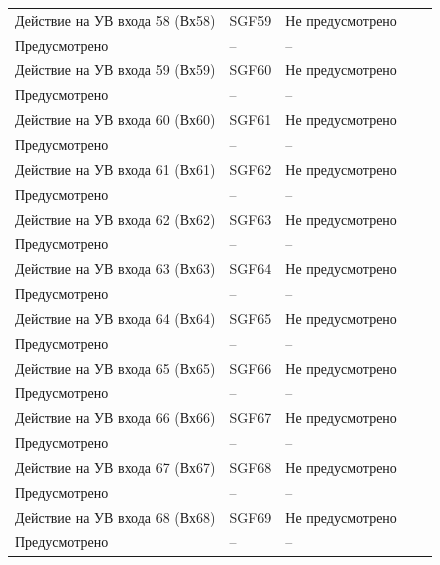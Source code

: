 \begin{longtable}{|>{\centering\arraybackslash}m{5.3cm}|>{\centering\arraybackslash}m{3.3cm}|>{\centering\arraybackslash}m{4.2cm}|>{\centering\arraybackslash}m{1.8cm}|>{\centering\arraybackslash}m{1cm}|}
\hline
\centering Действие на УВ входа 58 (Вх58)  & \centering SGF59 & \centering Не предусмотрено \\ Предусмотрено & \centering -- & \centering \arraybackslash -- \\
\hline
\centering Действие на УВ входа 59 (Вх59)  & \centering SGF60 & \centering Не предусмотрено \\ Предусмотрено & \centering -- & \centering \arraybackslash -- \\
\hline
\centering Действие на УВ входа 60 (Вх60)  & \centering SGF61 & \centering Не предусмотрено \\ Предусмотрено & \centering -- & \centering \arraybackslash -- \\
\hline
\centering Действие на УВ входа 61 (Вх61)  & \centering SGF62 & \centering Не предусмотрено \\ Предусмотрено & \centering -- & \centering \arraybackslash -- \\
\hline
\centering Действие на УВ входа 62 (Вх62)  & \centering SGF63 & \centering Не предусмотрено \\ Предусмотрено & \centering -- & \centering \arraybackslash -- \\
\hline
\centering Действие на УВ входа 63 (Вх63)  & \centering SGF64 & \centering Не предусмотрено \\ Предусмотрено & \centering -- & \centering \arraybackslash -- \\
\hline
\centering Действие на УВ входа 64 (Вх64)  & \centering SGF65 & \centering Не предусмотрено \\ Предусмотрено & \centering -- & \centering \arraybackslash -- \\
\hline
\centering Действие на УВ входа 65 (Вх65)  & \centering SGF66 & \centering Не предусмотрено \\ Предусмотрено & \centering -- & \centering \arraybackslash -- \\
\hline
\centering Действие на УВ входа 66 (Вх66)  & \centering SGF67 & \centering Не предусмотрено \\ Предусмотрено & \centering -- & \centering \arraybackslash -- \\
\hline
\centering Действие на УВ входа 67 (Вх67)  & \centering SGF68 & \centering Не предусмотрено \\ Предусмотрено & \centering -- & \centering \arraybackslash -- \\
\hline
\centering Действие на УВ входа 68 (Вх68)  & \centering SGF69 & \centering Не предусмотрено \\ Предусмотрено & \centering -- & \centering \arraybackslash -- \\

\end{longtable}
